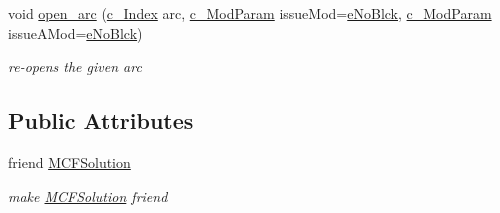 \begin{Indent}
\begin{DoxyCompactItemize}
void \mbox{\hyperlink{class_s_m_spp__di__unipi__it_1_1_m_c_f_block_abb7152054e9d24040576c5b0ef0c264e}{open\+\_\+arc}} (\mbox{\hyperlink{class_s_m_spp__di__unipi__it_1_1_m_c_f_block_aee6156e2ce80720d57a082d80f39d8cc}{c\+\_\+\+Index}} arc, \mbox{\hyperlink{group___modification___t_y_p_e_s_ga544246d8c462e9a2d817c2c30797968f}{c\+\_\+\+Mod\+Param}} issue\+Mod=\mbox{\hyperlink{group___modification___t_y_p_e_s_gga48fddcdd03a03f49b7e389ca1ed938d4ada69e89c5f46e563d8a13cfa6830c136}{e\+No\+Blck}}, \mbox{\hyperlink{group___modification___t_y_p_e_s_ga544246d8c462e9a2d817c2c30797968f}{c\+\_\+\+Mod\+Param}} issue\+A\+Mod=\mbox{\hyperlink{group___modification___t_y_p_e_s_gga48fddcdd03a03f49b7e389ca1ed938d4ada69e89c5f46e563d8a13cfa6830c136}{e\+No\+Blck}})
\begin{DoxyCompactList}\small\item\em re-\/opens the given arc \end{DoxyCompactList}\end{DoxyCompactItemize}
\end{Indent}
\subsection*{Public Attributes}
\begin{DoxyCompactItemize}
\item 
\mbox{\label{class_s_m_spp__di__unipi__it_1_1_m_c_f_block_a8fba6ddc24e0a100819b51bd6c4b4469}} 
friend \mbox{\hyperlink{class_s_m_spp__di__unipi__it_1_1_m_c_f_block_a8fba6ddc24e0a100819b51bd6c4b4469}{M\+C\+F\+Solution}}
\begin{DoxyCompactList}\small\item\em make \mbox{\hyperlink{class_s_m_spp__di__unipi__it_1_1_m_c_f_solution}{M\+C\+F\+Solution}} friend \end{DoxyCompactList}\end{DoxyCompactItemize}
